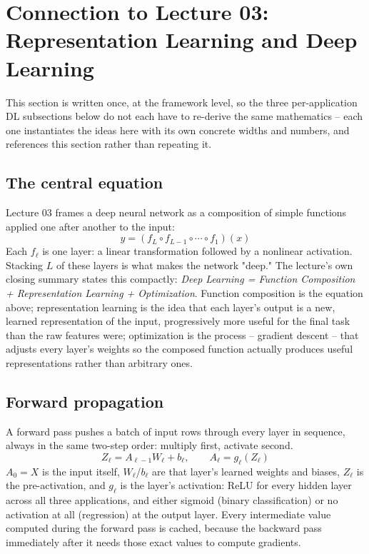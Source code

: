 \documentclass[11pt, a4paper]{article}
\begin{document}
\section{Connection to Lecture 03: Representation Learning and Deep Learning}
\label{sec:lecture}

This section is written once, at the framework level, so the three per-application DL
subsections below do not each have to re-derive the same mathematics -- each one
instantiates the ideas here with its own concrete widths and numbers, and references this
section rather than repeating it.

\subsection{The central equation}

Lecture 03 frames a deep neural network as a composition of simple functions applied one
after another to the input:
\[
\hat{y} = (f_L \circ f_{L-1} \circ \cdots \circ f_1)(x)
\]
Each $f_\ell$ is one layer: a linear transformation followed by a nonlinear activation.
Stacking $L$ of these layers is what makes the network "deep." The lecture's own closing
summary states this compactly: \textit{Deep Learning = Function Composition +
Representation Learning + Optimization}. Function composition is the equation above;
representation learning is the idea that each layer's output is a new, learned
representation of the input, progressively more useful for the final task than the raw
features were; optimization is the process -- gradient descent -- that adjusts every
layer's weights so the composed function actually produces useful representations rather
than arbitrary ones.

\subsection{Forward propagation}

A forward pass pushes a batch of input rows through every layer in sequence, always in the
same two-step order: multiply first, activate second.
\[
Z_\ell = A_{\ell-1} W_\ell + b_\ell, \qquad A_\ell = g_\ell(Z_\ell)
\]
$A_0 = X$ is the input itself, $W_\ell$/$b_\ell$ are that layer's learned weights and
biases, $Z_\ell$ is the pre-activation, and $g_\ell$ is the layer's activation: ReLU for
every hidden layer across all three applications, and either sigmoid (binary
classification) or no activation at all (regression) at the output layer. Every
intermediate value computed during the forward pass is cached, because the backward pass
immediately after it needs those exact values to compute gradients.
\end{document}
